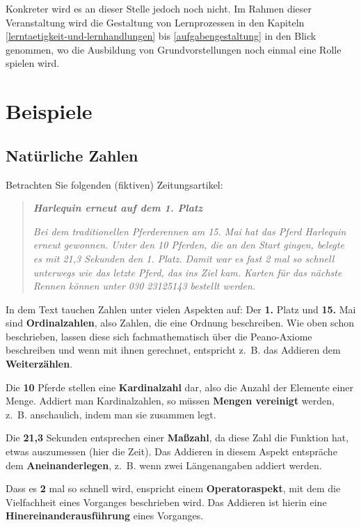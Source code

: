 \documentclass[
]{scrbook}
\theoremstyle{definition}
\theoremstyle{definition}
\theoremstyle{definition}
\theoremstyle{definition}
\theoremstyle{remark}
\begin{document}
Konkreter wird es an dieser Stelle jedoch noch nicht. Im Rahmen dieser Veranstaltung wird die Gestaltung von Lernprozessen in den Kapiteln \ref{lerntaetigkeit-und-lernhandlungen} bis \ref{aufgabengestaltung} in den Blick genommen, wo die Ausbildung von Grundvorstellungen noch einmal eine Rolle spielen wird.

\hypertarget{beispiele}{%
\section{Beispiele}\label{beispiele}}

\hypertarget{natuxfcrliche-zahlen}{%
\subsection{Natürliche Zahlen}\label{natuxfcrliche-zahlen}}

Betrachten Sie folgenden (fiktiven) Zeitungsartikel:

\begin{quote}
\textbf{\emph{Harlequin erneut auf dem 1. Platz}}

\emph{Bei dem traditionellen Pferderennen am 15. Mai hat das Pferd Harlequin erneut gewonnen. Unter den 10 Pferden, die an den Start gingen, belegte es mit 21,3 Sekunden den 1. Platz. Damit war es fast 2 mal so schnell unterwegs wie das letzte Pferd, das ins Ziel kam. Karten für das nächste Rennen können unter 030 23125143 bestellt werden.}
\end{quote}

In dem Text tauchen Zahlen unter vielen Aspekten auf: Der \textbf{1.} Platz und \textbf{15.} Mai sind \textbf{Ordinalzahlen}, also Zahlen, die eine Ordnung beschreiben. Wie oben schon beschrieben, lassen diese sich fachmathematisch über die Peano-Axiome beschreiben und wenn mit ihnen gerechnet, entspricht z.~B. das Addieren dem \textbf{Weiterzählen}.

Die \textbf{10} Pferde stellen eine \textbf{Kardinalzahl} dar, also die Anzahl der Elemente einer Menge. Addiert man Kardinalzahlen, so müssen \textbf{Mengen vereinigt} werden, z.~B. anschaulich, indem man sie zusammen legt.

Die \textbf{21,3} Sekunden entsprechen einer \textbf{Maßzahl}, da diese Zahl die Funktion hat, etwas auszumessen (hier die Zeit). Das Addieren in diesem Aspekt entspräche dem \textbf{Aneinanderlegen}, z.~B. wenn zwei Längenangaben addiert werden.

Dass es \textbf{2} mal so schnell wird, enspricht einem \textbf{Operatoraspekt}, mit dem die Vielfachheit eines Vorganges beschrieben wird. Das Addieren ist hierin eine \textbf{Hinereinanderausführung} eines Vorganges.
\end{document}
